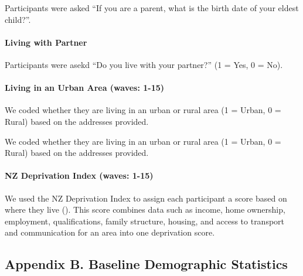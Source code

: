 \documentclass[
  singlecolumn]{article}
\let\oldparagraph\paragraph
\renewcommand{\paragraph}[1]{\oldparagraph{#1}\mbox{}}
\begin{document}
Participants were asked ``If you are a parent, what is the birth date of
your eldest child?''.

\paragraph{Living with Partner}\label{living-with-partner}

Participants were asekd ``Do you live with your partner?'' (1 = Yes, 0 =
No).

\paragraph{Living in an Urban Area (waves:
1-15)}\label{living-in-an-urban-area-waves-1-15}

We coded whether they are living in an urban or rural area (1 = Urban, 0
= Rural) based on the addresses provided.

We coded whether they are living in an urban or rural area (1 = Urban, 0
= Rural) based on the addresses provided.

\paragraph{NZ Deprivation Index (waves:
1-15)}\label{nz-deprivation-index-waves-1-15}

We used the NZ Deprivation Index to assign each participant a score
based on where they live (). This score combines data such as income, home ownership,
employment, qualifications, family structure, housing, and access to
transport and communication for an area into one deprivation score.

\subsection{Appendix B. Baseline Demographic
Statistics}\label{appendix-demographics}
\end{document}
